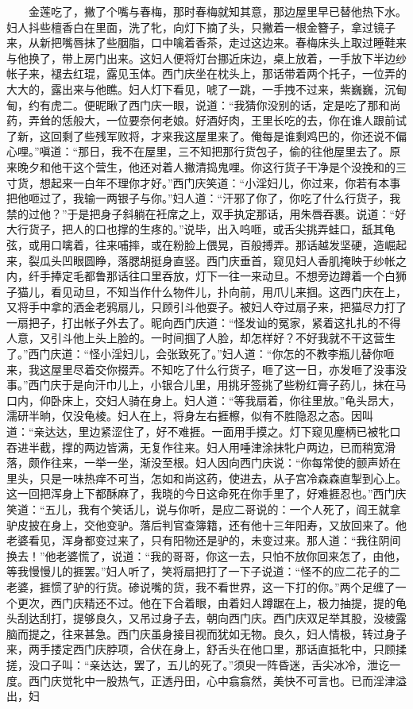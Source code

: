 　　金莲吃了，撇了个嘴与春梅，那时春梅就知其意，那边屋里早已替他热下水。妇人抖些檀香白在里面，洗了牝，向灯下摘了头，只撇着一根金簪子，拿过镜子来，从新把嘴唇抹了些胭脂，口中噙着香茶，走过这边来。春梅床头上取过睡鞋来与他换了，带上房门出来。这妇人便将灯台挪近床边，桌上放着，一手放下半边纱帐子来，褪去红琨，露见玉体。西门庆坐在枕头上，那话带着两个托子，一位弄的大大的，露出来与他瞧。妇人灯下看见，唬了一跳，一手拽不过来，紫巍巍，沉甸甸，约有虎二。便昵瞅了西门庆一眼，说道：“我猜你没别的话，定是吃了那和尚药，弄耸的恁般大，一位要奈何老娘。好酒好肉，王里长吃的去，你在谁人跟前试了新，这回剩了些残军败将，才来我这屋里来了。俺每是谁剩鸡巴的，你还说不偏心哩。”嗔道：“那日，我不在屋里，三不知把那行货包子，偷的往他屋里去了。原来晚夕和他干这个营生，他还对着人撇清捣鬼哩。你这行货子干净是个没挽和的三寸货，想起来一白年不理你才好。”西门庆笑道：“小淫妇儿，你过来，你若有本事把他咂过了，我输一两银子与你。”妇人道：“汗邪了你了，你吃了什么行货子，我禁的过他？”于是把身子斜躺在衽席之上，双手执定那话，用朱唇吞裹。说道：“好大行货子，把人的口也撑的生疼的。”说毕，出入呜咂，或舌尖挑弄蛙口，舐其龟弦，或用口噙着，往来哺摔，或在粉脸上偎晃，百般搏弄。那话越发坚硬，造崛起来，裂瓜头凹眼圆睁，落腮胡挺身直竖。西门庆垂首，窥见妇人香肌掩映于纱帐之内，纤手捧定毛都鲁那话往口里吞放，灯下一往一来动旦。不想旁边蹲着一个白狮子猫儿，看见动旦，不知当作什么物件儿，扑向前，用爪儿来掴。这西门庆在上，又将手中拿的洒金老鸦扇儿，只顾引斗他耍子。被妇人夺过扇子来，把猫尽力打了一扇把子，打出帐子外去了。昵向西门庆道：“怪发讪的冤家，紧着这扎扎的不得人意，又引斗他上头上脸的。一时间掴了人脸，却怎样好？不好我就不干这营生了。”西门庆道：“怪小淫妇儿，会张致死了。”妇人道：“你怎的不教李瓶儿替你咂来，我这屋里尽着交你掇弄。不知吃了什么行货子，咂了这一日，亦发咂了没事没事。”西门庆于是向汗巾儿上，小银合儿里，用挑牙签挑了些粉红膏子药儿，抹在马口内，仰卧床上，交妇人骑在身上。妇人道：“等我扇着，你往里放。”龟头昂大，濡研半晌，仅没龟棱。妇人在上，将身左右捱檫，似有不胜隐忍之态。因叫道：“亲达达，里边紧涩住了，好不难捱。一面用手摸之。灯下窥见麈柄已被牝口吞进半截，撑的两边皆满，无复作往来。妇人用唾津涂抹牝户两边，已而稍宽滑落，颇作往来，一举一坐，渐没至根。妇人因向西门庆说：“你每常使的颤声娇在里头，只是一味热痒不可当，怎如和尚这药，使进去，从子宫冷森森直掣到心上。这一回把浑身上下都酥麻了，我晓的今日这命死在你手里了，好难捱忍也。”西门庆笑道：“五儿，我有个笑话儿，说与你听，是应二哥说的：一个人死了，阎王就拿驴皮披在身上，交他变驴。落后判官查簿籍，还有他十三年阳寿，又放回来了。他老婆看见，浑身都变过来了，只有阳物还是驴的，未变过来。那人道：“我往阴间换去！”他老婆慌了，说道：“我的哥哥，你这一去，只怕不放你回来怎了，由他，等我慢慢儿的捱罢。”妇人听了，笑将扇把打了一下子说道：“怪不的应二花子的二老婆，捱惯了驴的行货。碜说嘴的货，我不看世界，这一下打的你。”两个足缠了一个更次，西门庆精还不过。他在下合着眼，由着妇人蹲踞在上，极力抽提，提的龟头刮达刮打，提够良久，又吊过身子去，朝向西门庆。西门庆双足举其股，没棱露脑而提之，往来甚急。西门庆虽身接目视而犹如无物。良久，妇人情极，转过身子来，两手搂定西门庆脖项，合伏在身上，舒舌头在他口里，那话直抵牝中，只顾揉搓，没口子叫：“亲达达，罢了，五儿的死了。”须臾一阵昏迷，舌尖冰冷，泄讫一度。西门庆觉牝中一股热气，正透丹田，心中翕翕然，美快不可言也。已而淫津溢出，妇